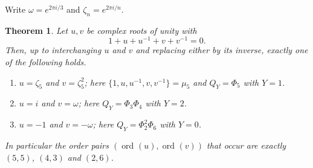 \documentclass[a4paper]{article}
\newtheorem{theorem}{Theorem}[section]
\newcommand{\ord}[2][]{\operatorname{ord}_{#1}\!\left(#2\right)}
\begin{document}
Write $\omega=e^{2\pi i/3}$ and $\zeta_n=e^{2\pi i/n}$.

\begin{theorem}\label{thm:charzero}
	Let $u,v$ be complex roots of unity with
	\begin{equation}\label{eq:charzero}
		1+u+u^{-1}+v+v^{-1}=0 .
	\end{equation}
	Then, up to interchanging $u$ and $v$ and replacing either by its
	inverse, exactly one of the following holds.
	\begin{enumerate}
		\item $u=\zeta_5$ and $v=\zeta_5^{2}$; here
		      $\{1,u,u^{-1},v,v^{-1}\}=\mu_5$ and $Q_Y=\Phi_5$ with $Y=1$.
		\item $u=i$ and $v=\omega$; here $Q_Y=\Phi_3\Phi_4$ with $Y=2$.
		\item $u=-1$ and $v=-\omega$; here $Q_Y=\Phi_2^{2}\Phi_6$ with
		      $Y=0$.
	\end{enumerate}
	In particular the order pairs $(\ord{u},\ord{v})$ that occur are
	exactly $(5,5)$, $(4,3)$ and $(2,6)$.
\end{theorem}
\end{document}
